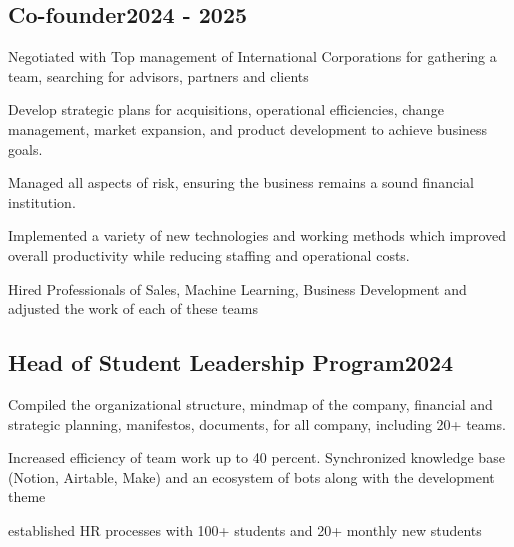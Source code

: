 \documentclass[a4paper,12pt]{article}
\begin{document}

\vspace*{6pt}
\subsection{{Co-founder}\hfill 2024 - 2025}
\begin{zitemize}
\item Negotiated with Top management of International Corporations for gathering a team, searching for advisors, partners and clients
\item Develop strategic plans for acquisitions, operational efficiencies, change management, market
expansion, and product development to achieve business goals.
\item Managed all aspects of risk, ensuring the business remains a sound financial institution.
\item Implemented a variety of new technologies and working methods which improved overall
productivity while reducing staffing and operational costs.
\item Hired Professionals of Sales, Machine Learning, Business Development and adjusted the work of each of these teams 
\end{zitemize}


\vspace*{6pt}
\subsection{{Head of Student Leadership Program}\hfill 2024}
\begin{zitemize}
\item Compiled the organizational structure, mindmap of the company, financial and strategic planning, manifestos, documents, for all company, including 20+ teams.
\item Increased efficiency of team work up to 40 percent. Synchronized knowledge base (Notion, Airtable, Make) and an ecosystem of bots along with the development theme 
\item established HR processes with 100+ students and 20+ monthly new students
\end{zitemize}

\vspace*{10pt}
\end{document}
